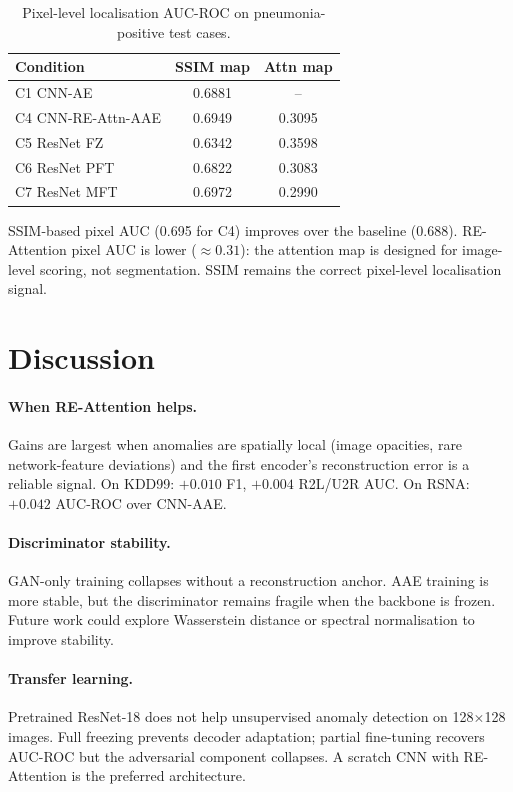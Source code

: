 \documentclass[11pt,a4paper]{article}
\newcommand{\method}{RE-Attn-AAE}
\begin{document}
\begin{table}[h]
\centering
\caption{Pixel-level localisation AUC-ROC on pneumonia-positive test cases.}
\label{tab:pixel}
\begin{tabular}{lcc}
\toprule
Condition & SSIM map & Attn map \\ \midrule
C1 CNN-AE          & 0.6881 & --     \\
C4 CNN-\method{}   & 0.6949 & 0.3095 \\
C5 ResNet FZ       & 0.6342 & 0.3598 \\
C6 ResNet PFT      & 0.6822 & 0.3083 \\
C7 ResNet MFT      & 0.6972 & 0.2990 \\ \bottomrule
\end{tabular}
\end{table}

SSIM-based pixel AUC (0.695 for C4) improves over the baseline (0.688).
RE-Attention pixel AUC is lower ($\approx 0.31$): the attention map is designed
for image-level scoring, not segmentation. SSIM remains the correct pixel-level
localisation signal.

\section{Discussion}

\paragraph{When RE-Attention helps.}
Gains are largest when anomalies are spatially local (image opacities, rare
network-feature deviations) and the first encoder's reconstruction error is a
reliable signal. On KDD99: $+0.010$ F1, $+0.004$ R2L/U2R AUC.
On RSNA: $+0.042$ AUC-ROC over CNN-AAE.

\paragraph{Discriminator stability.}
GAN-only training collapses without a reconstruction anchor.
AAE training is more stable, but the discriminator remains fragile when the
backbone is frozen. Future work could explore Wasserstein distance or spectral
normalisation to improve stability.

\paragraph{Transfer learning.}
Pretrained ResNet-18 does not help unsupervised anomaly detection on 128$\times$128
images. Full freezing prevents decoder adaptation; partial fine-tuning recovers
AUC-ROC but the adversarial component collapses.
A scratch CNN with RE-Attention is the preferred architecture.
\end{document}

